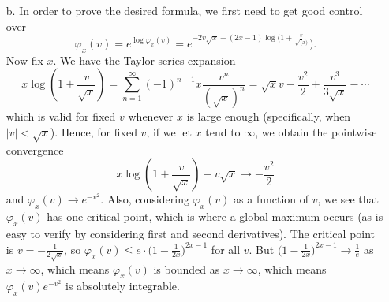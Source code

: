 \documentclass[11pt]{book}
\theoremstyle{definition}
\begin{document}
\begin{enumerate}
\begin{enumerate}
            \item[b.]   In order to prove the desired formula, we first need to get good control over
              \[ \varphi_x(v) = e^{\log \varphi_x(v)} = e^{-2v\sqrt{x} + (2x-1)\log(1+ \frac{v}{\sqrt(x)}})  . \]   %
              Now fix $x$.   We have the Taylor series expansion
              \[ x \log ( 1 + \frac{v}{\sqrt x} ) = \sum_{n=1}^\infty (-1)^{n-1} x \frac{v^n}{(\sqrt x)^n} = \sqrt x v - \frac{v^2}{2} + \frac{v^3}{3\sqrt x} - \cdots  \] which is valid for fixed $v$ whenever $x$ is large enough (specifically, when $|v| < \sqrt x$).  Hence, for fixed $v$, if we let $x$ tend to $\infty$, we obtain the pointwise convergence 
              \[ x \log (1 + \frac{v}{\sqrt x}) - v \sqrt x  \to -\frac{v^2}{2}  \] and $\varphi_x(v) \to e^{-v^2}$.   Also, considering $\varphi_x(v)$ as a function of $v$, we see that $\varphi_x(v)$ has one critical point, which is where a global maximum occurs (as is easy to verify by considering first and second derivatives).  The critical point is $v=-\frac{1}{2\sqrt x}$, so  $\varphi_x(v) \leq e \cdot \Big(1 - \frac{1}{2x} \Big)^{2x-1}$ for all $v$.  But $\Big(1 - \frac{1}{2x} \Big)^{2x-1} \to \tfrac 1 e$ as $x\to \infty$, which means $\varphi_x(v)$ is bounded as $x\to \infty$, which means $\varphi_x(v) e^{-v^2}$ is absolutely integrable. 

\end{enumerate}
\end{enumerate}
\end{document}
